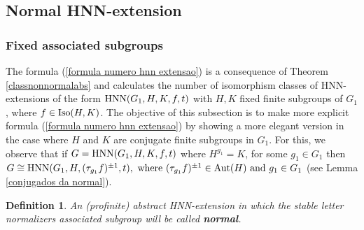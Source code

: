 \documentclass[a4paper,12pt]{article}
\newtheorem{deff}[thm]{Definition}
\def\OE{{\rm OE}}
\def\aut {{\rm Aut}}
\def\hnn {{\rm HNN}}
\def\Iso {{\rm Iso}}
\newtheorem{rem}[thm]{Remark}
\begin{document}
{%


\subsection{Normal HNN-extension} \label{cota bonita conjugados}

 





\subsubsection{Fixed associated subgroups}

The formula (\ref{formula numero hnn extensao}) is a consequence of  Theorem \ref{classnonnormalabs} and calculates the number of isomorphism classes of HNN-extensions of the form $\hnn(G_1,H,K,f,t)$ with $H,K$ fixed finite subgroups of $G_1$, where $ f\in \Iso(H,K)$.
The objective of this subsection is to make more explicit  formula (\ref{formula numero hnn extensao})  by showing a more elegant version in the case where $H$ and $K$ are conjugate finite subgroups in $G_1$.
 For this, we observe that if $G=\hnn(G_1,H,K,f,t)$ where $H^{g_1}=K$, for some $ g_1\in G_1$ then $G\cong \hnn(G_1, H, (\tau_{g_1}f)^{\pm 1}, t), \mbox{ where } (\tau_{g_1}f)^{\pm 1} \in \aut(H) \mbox{ and } g_1 \in G_1$ (see Lemma \ref{conjugados da normal}).  

\begin{deff}
An (profinite) abstract HNN-extension in which the stable letter normalizers associated subgroup will be called \textbf{normal}. 
\end{deff}

}
\end{document}

